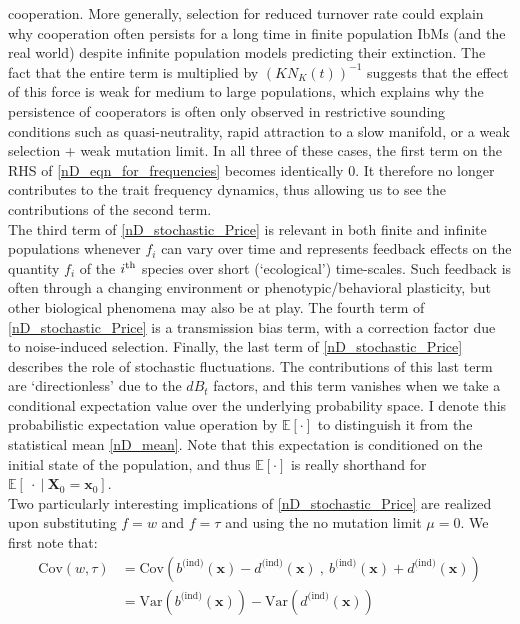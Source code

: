 cooperation. More generally, selection for reduced turnover rate could explain why cooperation often persists for a long time in finite population IbMs (and the real world) despite infinite population models predicting their extinction. The fact that the entire term is multiplied by $(KN_K(t))^{-1}$ suggests that the effect of this force is weak for medium to large populations, which explains why the persistence of cooperators is often only observed in restrictive sounding conditions such as quasi-neutrality, rapid attraction to a slow manifold, or a weak selection + weak mutation limit. In all three of these cases, the first term on the RHS of \eqref{nD_eqn_for_frequencies} becomes identically 0. It therefore no longer contributes to the trait frequency dynamics, thus allowing us to see the contributions of the second term.\\
The third term of \eqref{nD_stochastic_Price} is relevant in both finite and infinite populations whenever $f_i$ can vary over time and represents feedback effects on the quantity $f_i$ of the $i\textsuperscript{th}$ species over short (`ecological') time-scales. Such feedback is often through a changing environment or phenotypic/behavioral plasticity, but other biological phenomena may also be at play.  The fourth term of \eqref{nD_stochastic_Price} is a transmission bias term, with a correction factor due to noise-induced selection. Finally, the last term of \eqref{nD_stochastic_Price} describes the role of stochastic fluctuations. The contributions of this last term are `directionless' due to the $dB_t$ factors, and this term vanishes when we take a conditional expectation value over the underlying probability space. I denote this probabilistic expectation value operation by $\mathbb{E}[\cdot]$ to distinguish it from the statistical mean \eqref{nD_mean}.  Note that this expectation is conditioned on the initial state of the population, and thus $\mathbb{E}[\cdot]$ is really shorthand for $\mathbb{E}[\ \cdot \ | \ \mathbf{X}_0 = \mathbf{x}_0]$.
\\
Two particularly interesting implications of \eqref{nD_stochastic_Price} are realized upon substituting $f=w$ and $f = \tau$ and using the no mutation limit $\mu = 0$. We first note that:
\begin{align}
\textrm{Cov}(w,\tau) &=\textrm{Cov}\left( b^{\textrm{(ind)}}(\mathbf{x}) - d^{\textrm{(ind)}}(\mathbf{x}) \ , \   b^{\textrm{(ind)}}(\mathbf{x}) + d^{\textrm{(ind)}}(\mathbf{x})\right)\\
&= \textrm{Var}(b^{\textrm{(ind)}}(\mathbf{x})) - \textrm{Var}(d^{\textrm{(ind)}}(\mathbf{x}))\label{nD_cross_covariance}
\end{align}
